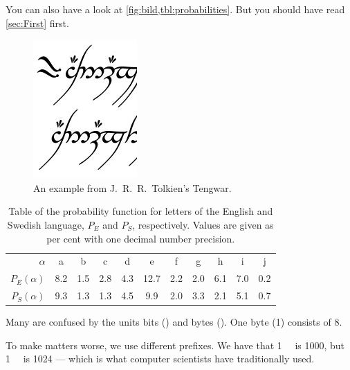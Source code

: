 \documentclass[a4paper]{article}
\begin{document}
You can also have a look at \cref{fig:bild,tbl:probabilities}.
But you should have read \cref{sec:First} first.

\begin{figure}
  \centering
  \includegraphics[width=0.2\linewidth]{../figs/tengwar.jpg}
  \caption{An example from J.~R.~R.~Tolkien's Tengwar.}
  \label{fig:bild}
\end{figure}

\begin{table}
  \centering
  \begin{tabular}{rcccccccccc}
    \toprule
    \(\alpha\) & a & b & c & d & e & f & g & h & i & j \\
    \(P_E(\alpha)\) & 8.2  & 1.5 & 2.8 & 4.3 & 12.7 & 2.2 & 2.0 & 6.1 & 7.0 & 0.2 \\
    \(P_S(\alpha)\) & 9.3  & 1.3 & 1.3 & 4.5 & 9.9 & 2.0 & 3.3 & 2.1 & 5.1 & 0.7 \\
    \bottomrule
  \end{tabular}
  \caption{Table of the probability function for letters of the English and 
  Swedish language, \(P_E\) and \(P_S\), respectively.
  Values are given as per cent with one decimal number precision.}
  \label{tbl:probabilities}
\end{table}

Many are confused by the units bits (\si{\bit}) and bytes (\si{\byte}).
One byte (\SI{1}{\byte}) consists of \SI{8}{\bit}.

To make matters worse, we use different prefixes.
We have that \SI{1}{\kilo\byte} is \SI{1000}{\byte}, but \SI{1}{\kibi\byte} is 
\SI{1024}{\byte} --- which is what computer scientists have traditionally used.


\printbibliography
\end{document}
